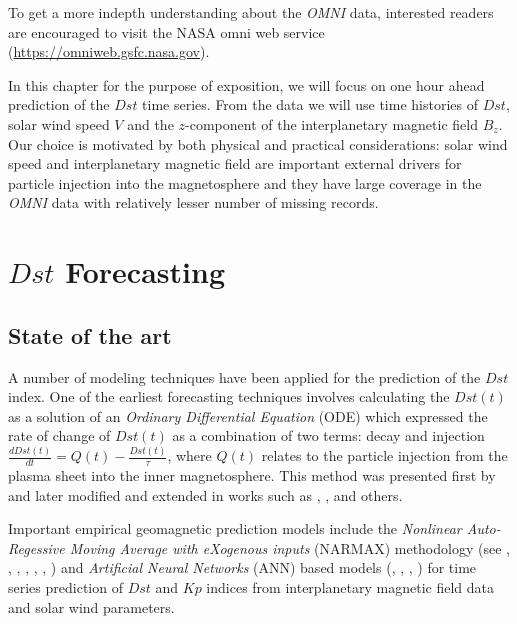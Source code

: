 \documentclass{article}
\begin{document}
To get a more indepth understanding about the \emph{OMNI} data, interested readers are encouraged to visit the NASA omni web service (\url{https://omniweb.gsfc.nasa.gov}).

In this chapter for the purpose of exposition, we will focus on one hour ahead prediction of the $Dst$ time series. From the data we will use time histories of $Dst$, solar wind speed $V$ and the $z$-component of the interplanetary magnetic field $B_z$. Our choice is motivated by both physical and practical considerations: solar wind speed and interplanetary magnetic field are important external drivers for particle injection into the magnetosphere and they have large coverage in the \emph{OMNI} data with relatively lesser number of missing records.

\section{$Dst$ Forecasting}

\subsection{State of the art}

A number of modeling techniques have been applied for the prediction of the $Dst$ index. One of the earliest forecasting techniques involves calculating the $Dst(t)$ as a solution of an \emph{Ordinary Differential Equation} (ODE) which expressed the rate of change of $Dst(t)$ as a combination of two terms: decay and injection $\frac{d Dst(t)}{dt} = Q(t) - \frac{Dst(t)}{\tau}$, where $Q(t)$ relates to the particle injection from the plasma sheet into the inner magnetosphere. This method was presented first by \citet{JGR:JGR10260} and later modified and extended in works such as \citet{Wang:Dst}, \citet{JGRA:JGRA14856}, \citet{Ballatore2014} and others.

Important empirical geomagnetic prediction models include the \emph{Nonlinear Auto-Regessive Moving Average with eXogenous inputs} (NARMAX) methodology (see \citet{doi:10.1080/00207178908559767}, \citet{GRL:GRL13494}, \citet{GRL:GRL20944}, \citet{JGRA:JGRA18657}, \citet{balikhin:narmax}, \citet{JGRA:JGRA20661}, \citet{JGRA:JGRA50192}) and \emph{Artificial Neural Networks} (ANN) based models (\citet{Lund}, \citet{JGRA:JGRA17461}, \citet{SWE:SWE286}, \citet{pallocchia:hal-00318011}) for time series prediction of $Dst$ and $Kp$ indices from interplanetary magnetic field data and solar wind parameters. 
\end{document}
